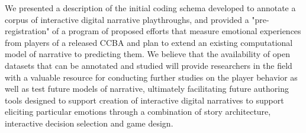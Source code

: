 We presented a description of the initial coding schema developed to
annotate a corpus of interactive digital narrative playthroughs, and
provided a "pre-registration" of a program of proposed efforts that
measure emotional experiences from players of a released CCBA and plan
to extend an existing computational model of narrative to predicting
them. We believe that the availability of open datasets that can be
annotated and studied will provide researchers in the field with a
valuable resource for conducting further studies on the player
behavior as well as test future models of narrative, ultimately
facilitating future authoring tools designed to support creation of
interactive digital narratives to support eliciting particular
emotions through a combination of story architecture, interactive
decision selection and game design.
